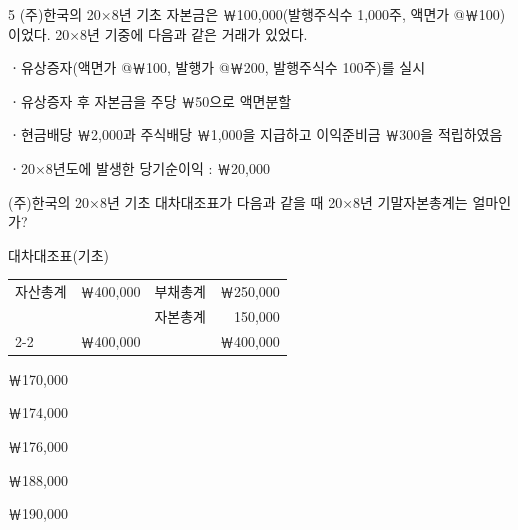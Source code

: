\begin{question}{5}
(주)한국의 20×8년 기초 자본금은 ￦100,000(발행주식수 1,000주, 액면가 @￦100)이었다. 20×8년 기중에 다음과 같은 거래가 있었다.
\begin{framedtext}
ㆍ유상증자(액면가 @￦100, 발행가 @￦200, 발행주식수 100주)를 실시 \par
ㆍ유상증자 후 자본금을 주당 ￦50으로 액면분할 \par
ㆍ현금배당 ￦2,000과 주식배당 ￦1,000을 지급하고 이익준비금 ￦300을 적립하였음 \par
ㆍ20×8년도에 발생한 당기순이익 : ￦20,000
\end{framedtext}
(주)한국의 20×8년 기초 대차대조표가 다음과 같을 때 20×8년 기말자본총계는 얼마인가?

{\small\centering
대차대조표(기초)\par
\begin{tabular}{lr|lr}
자산총계 & ￦400,000 & 부채총계 & ￦250,000 \\
 & & 자본총계 & 150,000 \\
\cline{2-2}\cline{4-4}
 & ￦400,000 & & ￦400,000 \\
\end{tabular}\par}

\begin{choices}
  \item ￦170,000
  \item ￦174,000
  \item ￦176,000
  \item ￦188,000
  \item ￦190,000
\end{choices}
\end{question}
